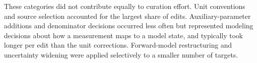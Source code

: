 These categories did not contribute equally to curation effort. Unit conventions and source selection accounted for the largest share of edits. Auxiliary-parameter additions and denominator decisions occurred less often but represented modeling decisions about how a measurement maps to a model state, and typically took longer per edit than the unit corrections. Forward-model restructuring and uncertainty widening were applied selectively to a smaller number of targets.
